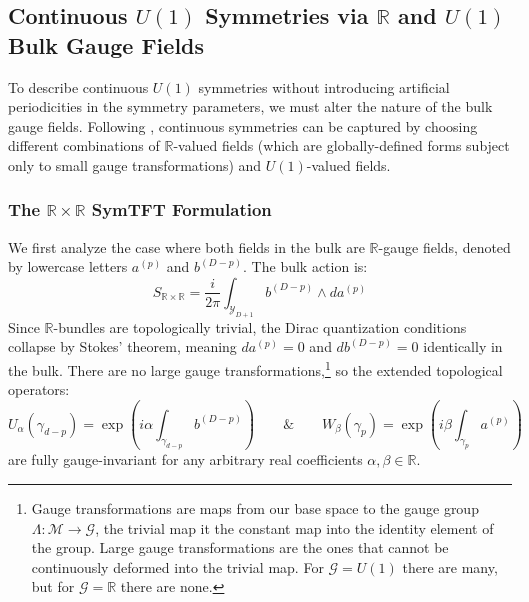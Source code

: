 \documentclass[aps,preprint,nofootinbib,preprintnumbers,eqsecnum,superscriptaddress]{revtex4}
\numberwithin{equation}{section}
\begin{document}
\subsection{Continuous $U(1)$ Symmetries via $\mathbb{R}$ and $U(1)$ Bulk Gauge Fields}
\label{sec:symtft_continuous_gauging}

To describe continuous $U(1)$ symmetries without introducing artificial periodicities in the symmetry parameters, we must alter the nature of the bulk gauge fields. Following \cite{Antinucci_2025}, continuous symmetries can be captured by choosing different combinations of $\mathbb{R}$-valued fields (which are globally-defined forms subject only to small gauge transformations) and $U(1)$-valued fields.

\subsubsection{The $\mathbb{R} \times \mathbb{R}$ SymTFT Formulation}
\label{sec:R_R_symtft}

We first analyze the case where both fields in the bulk are $\mathbb{R}$-gauge fields, denoted by lowercase letters $a^{(p)}$ and $b^{(D-p)}$. The bulk action is:
\begin{equation}
    S_{\mathbb{R}\times\mathbb{R}} = \frac{i}{2\pi} \int_{\mathcal{Y}_{D+1}} b^{(D-p)} \wedge da^{(p)}
\end{equation}
Since $\mathbb{R}$-bundles are topologically trivial, the Dirac quantization conditions collapse by Stokes' theorem, meaning $da^{(p)} = 0$ and $db^{(D-p)} = 0$ identically in the bulk. There are no large gauge transformations,\footnote{Gauge transformations are maps from our base space to the gauge group $\Lambda : \mathcal{M} \to \mathcal{G}$, the trivial map it the constant map into the identity element of the group. Large gauge transformations are the ones that cannot be continuously deformed into the trivial map. For $\mathcal{G}=U(1)$ there are many, but for $\mathcal{G}=\mathbb{R}$ there are none.} so the extended topological operators:
\begin{equation}
    U_\alpha (\gamma_{d-p}) = \exp \left(i\alpha \int_{\gamma_{d-p}} b^{(D-p)}\right) \qquad \& \qquad W_\beta (\gamma_p) = \exp \left(i\beta \int_{\gamma_p} a^{(p)}\right)
\end{equation}
are fully gauge-invariant for any arbitrary real coefficients $\alpha, \beta \in \mathbb{R}$. 
\end{document}
